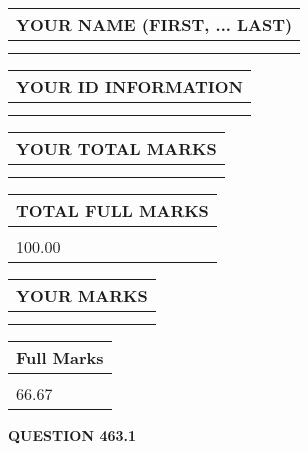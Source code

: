 \documentclass{ctexart}
\begin{document}
   
   
   
\newpage 
\setcounter{page}{ 
   463001 } 
   
   
   
   
\noindent\begin{tabular}{|l|}
\hline
YOUR NAME (FIRST, ... LAST)  \\
\hline
 \\ 
 \\ 
\hline
\end{tabular}
\hspace{0.05in} \begin{tabular}{|l|}
\hline
 YOUR   ID   INFORMATION  \\
\hline
 \\ 
 \\ 
\hline
\end{tabular}
   
   
\vspace{0.2in}\noindent\begin{tabular}{|l|}
\hline
YOUR TOTAL MARKS  \\
\hline
 \\ 
 \\ 
\hline
\end{tabular}
\hspace{0.05in} \begin{tabular}{|l|}
\hline
TOTAL FULL MARKS  \\
\hline
 \\ 
100.00 \\
\hline
\end{tabular}
   
   
 \vspace{0.2in}
 
 
 
 
   
   
  
\vspace{0.2in}
  
\noindent\begin{tabular}{|l|}
\hline
 YOUR MARKS  \\
\hline
 \\ 
 \\ 
\hline
\end{tabular}
\hspace{0.05in} \begin{tabular}{|l|}
\hline
 Full Marks  \\
\hline
 \\ 
66.67 \\
\hline
\end{tabular}
{\textbf{\Large{QUESTION
463.1 
}}}
  
\end{document}
